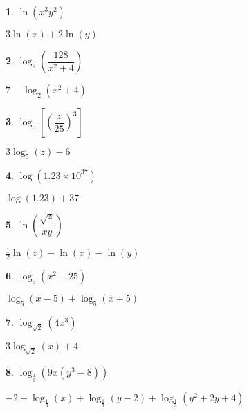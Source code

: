 \documentclass{amsbook}
\newtheorem{exc}{}
\newenvironment{ex}{\begin{exc}\normalfont}{\end{exc}}
\numberwithin{section}{chapter}
\numberwithin{equation}{chapter}
\begin{document}
\begin{multicols}{2}

\begin{ex}
	$\ln(x^{3}y^{2})$ 
	\begin{sol}
		$3\ln(x) + 2\ln(y)$
	\end{sol}
\end{ex}

\begin{ex}
	$\log_{2}\left(\dfrac{128}{x^{2} + 4}\right)$
	\begin{sol}
		$7 - \log_{2}(x^{2} + 4)$
	\end{sol}
\end{ex}


\begin{ex}
	$\log_{5}\left[ \left(\dfrac{z}{25}\right)^{3}\right]$
	\begin{sol}
		$3\log_{5}(z) - 6$
	\end{sol}
\end{ex}


\begin{ex}
	$\log(1.23 \times 10^{37})$
	\begin{sol}
	 $\log(1.23) + 37$
	\end{sol}
\end{ex}


\begin{ex}
	$\ln\left(\dfrac{\sqrt{z}}{xy}\right)$
	\begin{sol}
		$\frac{1}{2}\ln(z) - \ln(x) - \ln(y)$
	\end{sol}
\end{ex}

\begin{ex}
	$\log_{5} \left(x^2 - 25 \right)$
	\begin{sol}
		$\log_{5}(x-5) + \log_{5}(x+5)$
	\end{sol}
\end{ex}

\begin{ex}
	$\log_{\sqrt{2}} \left(4x^3\right)$
	\begin{sol}
		$3\log_{\sqrt{2}}(x) + 4$
	\end{sol}
\end{ex}


\begin{ex}
	$\log_{\frac{1}{3}}(9x(y^{3} - 8))$
	\begin{sol}
		\small$-2 + \log_{\frac{1}{3}}(x) + \log_{\frac{1}{3}}(y - 2) + \log_{\frac{1}{3}}(y^{2} + 2y + 4)$\normalsize
	\end{sol}
\end{ex}



\end{multicols}
\end{document}
